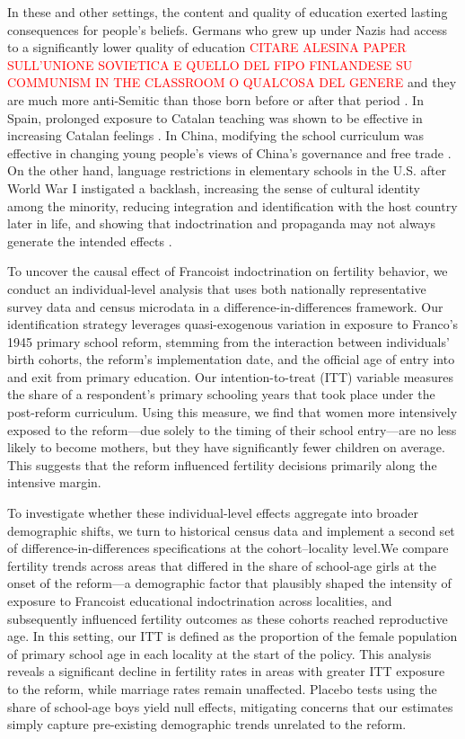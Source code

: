 \documentclass[a4paper,oneside,final,onecolumn,11pt,english]{article}
\begin{document}
 In these and other settings, the content and quality of education exerted lasting consequences for people's beliefs. Germans who grew up under Nazis had access to a significantly lower quality of education  \textcolor{red}{CITARE ALESINA PAPER SULL'UNIONE SOVIETICA E QUELLO DEL FIPO FINLANDESE SU COMMUNISM IN THE CLASSROOM O QUALCOSA DEL GENERE}
 \citep{waldinger2010quality, waldinger2012peer} and they are much more anti-Semitic than those born before or after that period \citep{voigtlander2015}. In Spain, prolonged exposure to Catalan teaching was shown to be effective in increasing Catalan feelings \citep{clots_masella2013}. In China, modifying the school curriculum was effective in changing young people's views of China's governance and free trade \citep{cantoni2017curriculum}. On the other hand, language restrictions in elementary schools in the U.S. after World War I instigated a backlash, increasing the sense of cultural identity among the minority, reducing integration and identification with the host country later in life, and showing that indoctrination and propaganda may not always generate the intended effects \citep{fouka2020}.
 
To uncover the causal effect of Francoist indoctrination on fertility behavior, we conduct an individual-level analysis that uses both nationally representative survey data and census microdata in a difference-in-differences framework. Our identification strategy leverages quasi-exogenous variation in exposure to Franco’s 1945 primary school reform, stemming from the interaction between individuals’ birth cohorts, the reform’s implementation date, and the official age of entry into and exit from primary education. Our intention-to-treat (ITT) variable measures the share of a respondent’s primary schooling years that took place under the post-reform curriculum. Using this measure, we find that women more intensively exposed to the reform—due solely to the timing of their school entry—are no less likely to become mothers, but they have significantly fewer children on average. This suggests that the reform influenced fertility decisions primarily along the intensive margin.

To investigate whether these individual-level effects aggregate into broader demographic shifts, we turn to historical census data and implement a second set of difference-in-differences specifications at the cohort–locality level.We compare fertility trends across areas that differed in the share of school-age girls at the onset of the reform—a demographic factor that plausibly shaped the intensity of exposure to Francoist educational indoctrination across localities, and subsequently influenced fertility outcomes as these cohorts reached reproductive age.  In this setting, our ITT is defined as the proportion of the female population of primary school age in each locality at the start of the policy. This analysis reveals a significant decline in fertility rates in areas with greater ITT exposure to the reform, while marriage rates remain unaffected. Placebo tests using the share of school-age boys yield null effects, mitigating concerns that our estimates simply capture pre-existing demographic trends unrelated to the reform.
\end{document}
